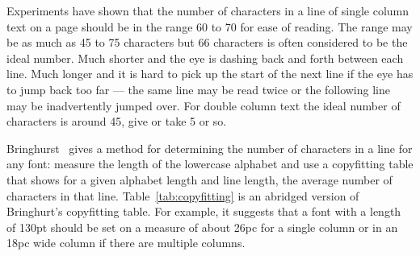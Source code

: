     Experiments have shown that the number of characters in a line of
single column text on a page should be
in the range 60 to 70 for ease of reading. The range may be as much
as 45 to 75 characters but 66 characters is often
considered to be the ideal number. Much shorter and the eye is dashing
back and forth between each line. Much longer and it is hard to pick up the
start of the next line if the eye has to jump back too far --- the same line
may be read twice or the following line may be inadvertently jumped over.
For double column text the ideal number of characters 
is around 45, give or take 5 or so.

    Bringhurst~\cite{BRINGHURST99} gives a 
method for determining the number
of characters in a line for any font: 
measure the length of the lowercase alphabet and use a 
copyfitting 
table that shows for a given alphabet 
length and line length, the average number of characters in that line.
 Table~\ref{tab:copyfitting} is an
abridged version of Bringhurt's copyfitting table.
For example, it suggests that a font with a length of 130pt should be
set on a measure of about 26pc for a single column 
or in an 18pc wide column if there are multiple 
columns.
 

